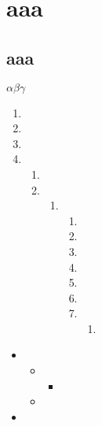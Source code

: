 \documentclass{ctexart}
\begin{document}
\chapter{aaa}
\section{aaa}
\(\alpha \beta \gamma\)
\begin{enumerate}
	\item
	\item
	\item
	\item
	      \begin{enumerate}
		      \item
		      \item
		            \begin{enumerate}
			            \item
			                  \begin{enumerate}
				                  \item
				                  \item
				                  \item
				                  \item
				                  \item
				                  \item
				                  \item
				                        \begin{enumerate}
					                        \item
				                        \end{enumerate}

			                  \end{enumerate}
		            \end{enumerate}
	      \end{enumerate}
\end{enumerate}
\begin{itemize}
	\begin{itemize}
		\item
		      \begin{itemize}
			      \item
			            \begin{itemize}
				            \item
			            \end{itemize}
			      \item
		      \end{itemize}
		\item
	\end{itemize}
\end{itemize}
\end{document}
